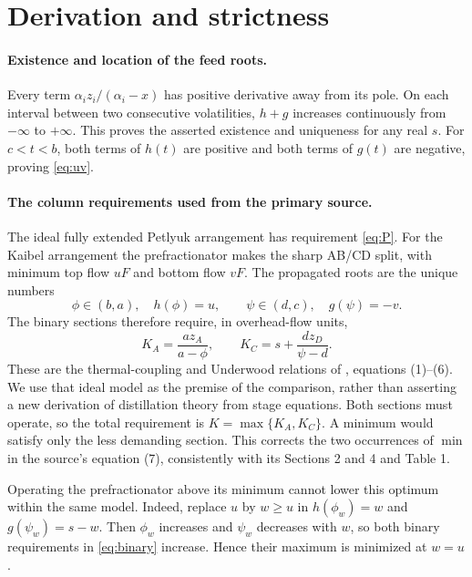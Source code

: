 \documentclass[11pt,a4paper]{report}
\begin{document}
\section{Derivation and strictness}
\paragraph{Existence and location of the feed roots.}
Every term \(\alpha_i z_i/(\alpha_i-x)\) has positive derivative away
from its pole. On each interval between two consecutive volatilities,
\(h+g\) increases continuously from \(-\infty\) to \(+\infty\).
This proves the asserted existence and uniqueness for any real \(s\).
For \(c<t<b\), both terms of \(h(t)\) are positive and both terms of
\(g(t)\) are negative, proving \eqref{eq:uv}.

\paragraph{The column requirements used from the primary source.}
The ideal fully extended Petlyuk arrangement has requirement \eqref{eq:P}.
For the Kaibel arrangement the prefractionator makes the sharp AB/CD split,
with minimum top flow \(uF\) and bottom flow \(vF\).
The propagated roots are the unique numbers
\begin{equation}\label{eq:propagated}
 \phi\in(b,a),\quad h(\phi)=u,\qquad
 \psi\in(d,c),\quad g(\psi)=-v.
\end{equation}
The binary sections therefore require, in overhead-flow units,
\begin{equation}\label{eq:binary}
 K_A=\frac{az_A}{a-\phi},\qquad
 K_C=s+\frac{dz_D}{\psi-d}.
\end{equation}
These are the thermal-coupling and Underwood relations of
\autocite{HS2006}, equations (1)--(6). We use that ideal model as the
premise of the comparison, rather than asserting a new derivation of
distillation theory from stage equations.
Both sections must operate, so the total requirement is
\(K=\max\{K_A,K_C\}\). A minimum would satisfy only the less demanding
section. This corrects the two occurrences of \(\min\) in the source's
equation (7), consistently with its Sections 2 and 4 and Table 1.

Operating the prefractionator above its minimum cannot lower this optimum
within the same model. Indeed, replace \(u\) by \(w\ge u\) in
\(h(\phi_w)=w\) and \(g(\psi_w)=s-w\). Then \(\phi_w\) increases
and \(\psi_w\) decreases with \(w\), so both binary requirements in
\eqref{eq:binary} increase. Hence their maximum is minimized at \(w=u\).
\end{document}
